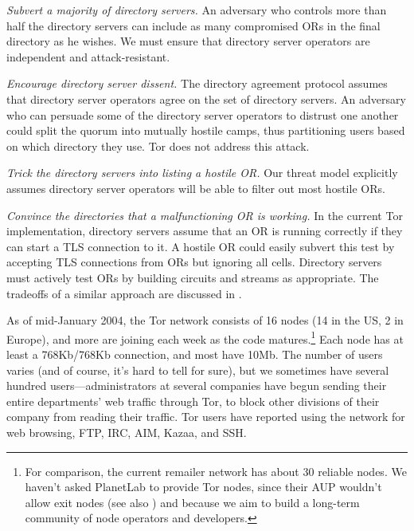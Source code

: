 \documentclass[times,10pt,twocolumn]{article}
\begin{document}
\emph{Subvert a majority of directory servers.} An adversary who controls
more than half the directory servers can include as many compromised
ORs in the final directory as he wishes. We must ensure that directory
server operators are independent and attack-resistant.

\emph{Encourage directory server dissent.}  The directory
agreement protocol assumes that directory server operators agree on
the set of directory servers.  An adversary who can persuade some
of the directory server operators to distrust one another could
split the quorum into mutually hostile camps, thus partitioning
users based on which directory they use.  Tor does not address
this attack.

\emph{Trick the directory servers into listing a hostile OR.}
Our threat model explicitly assumes directory server operators will
be able to filter out most hostile ORs.

\emph{Convince the directories that a malfunctioning OR is
working.}  In the current Tor implementation, directory servers
assume that an OR is running correctly if they can start a TLS
connection to it.  A hostile OR could easily subvert this test by
accepting TLS connections from ORs but ignoring all cells. Directory
servers must actively test ORs by building circuits and streams as
appropriate.  The tradeoffs of a similar approach are discussed in
\cite{mix-acc}.\\


\label{sec:in-the-wild}

As of mid-January 2004, the Tor network consists of 16 nodes
(14 in the US, 2 in Europe), and more are joining each week as the code
matures.\footnote{For comparison, the current remailer network
has about 30 reliable nodes. We haven't asked PlanetLab to provide
Tor nodes, since their AUP wouldn't allow exit nodes (see also
\cite{darkside}) and because we aim to build a long-term community of
node operators and developers.} Each node has at least a 768Kb/768Kb
connection, and
most have 10Mb. The number of users varies (and of course, it's hard to
tell for sure), but we sometimes have several hundred users---administrators at
several companies have begun sending their entire departments' web
traffic through Tor, to block other divisions of
their company from reading their traffic. Tor users have reported using
the network for web browsing, FTP, IRC, AIM, Kazaa, and SSH.
\end{document}
